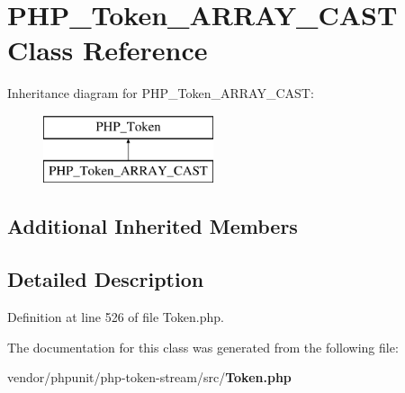 \section{P\+H\+P\+\_\+\+Token\+\_\+\+A\+R\+R\+A\+Y\+\_\+\+C\+A\+S\+T Class Reference}
\label{class_p_h_p___token___a_r_r_a_y___c_a_s_t}
Inheritance diagram for P\+H\+P\+\_\+\+Token\+\_\+\+A\+R\+R\+A\+Y\+\_\+\+C\+A\+S\+T\+:\begin{figure}[H]
\begin{center}
\leavevmode
\includegraphics[height=2.000000cm]{class_p_h_p___token___a_r_r_a_y___c_a_s_t}
\end{center}
\end{figure}
\subsection*{Additional Inherited Members}


\subsection{Detailed Description}


Definition at line 526 of file Token.\+php.



The documentation for this class was generated from the following file\+:\begin{DoxyCompactItemize}
\item 
vendor/phpunit/php-\/token-\/stream/src/{\bf Token.\+php}\end{DoxyCompactItemize}
